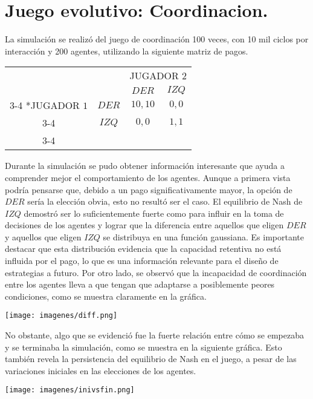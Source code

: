 \documentclass[12pt]{article}
\begin{document}
\section{Juego evolutivo: Coordinacion.}
\begin{flushleft}
    La simulación se realizó del juego de coordinación 100 veces, con 10 mil ciclos por interacción y 200 agentes, utilizando la siguiente matriz de pagos.
\end{flushleft}
\begin{center}    
    \setlength{\extrarowheight}{0pt}
    \begin{tabular}{cc|c|c|}
        & \multicolumn{1}{c}{} & \multicolumn{2}{c}{JUGADOR $2$}\\
        & \multicolumn{1}{c}{} & \multicolumn{1}{c}{$DER$}  & \multicolumn{1}{c}{$IZQ$} \\\cline{3-4}
        \multirow{2}*{JUGADOR $1$}  & $DER$ & $10,10$ & $0,0$ \\\cline{3-4}
        & $IZQ$ & $0,0$ & $1,1$ \\\cline{3-4}
    \end{tabular}
\end{center}
\begin{flushleft}
    Durante la simulación se pudo obtener información interesante que ayuda a comprender mejor el comportamiento de los agentes. Aunque a primera vista podría pensarse que, debido a un pago significativamente mayor, la opción de $DER$ sería la elección obvia, esto no resultó ser el caso. El equilibrio de Nash de $IZQ$ demostró ser lo suficientemente fuerte como para influir en la toma de decisiones de los agentes y lograr que la diferencia entre aquellos que eligen $DER$ y aquellos que eligen $IZQ$ se distribuya en una función gaussiana.
    Es importante destacar que esta distribución evidencia que la capacidad retentiva no está influida por el pago, lo que es una información relevante para el diseño de estrategias a futuro. Por otro lado, se observó que la incapacidad de coordinación entre los agentes lleva a que tengan que adaptarse a posiblemente peores condiciones, como se muestra claramente en la gráfica.
    \begin{center}\texttt{[image: imagenes/diff.png]}\end{center}
    No obstante, algo que se evidenció fue la fuerte relación entre cómo se empezaba y se terminaba la simulación, como se muestra en la siguiente gráfica. Esto también revela la persistencia del equilibrio de Nash en el juego, a pesar de las variaciones iniciales en las elecciones de los agentes.
    \begin{center}\texttt{[image: imagenes/inivsfin.png]}\end{center}
\end{flushleft}
\end{document}
